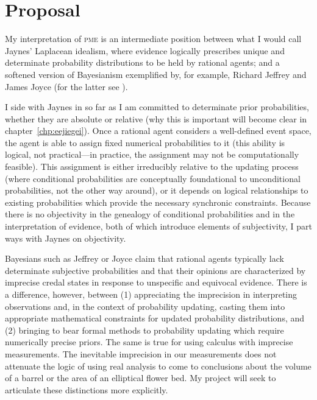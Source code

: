 \documentclass[phd,12pt,oneside]{ubcthesis}
\begin{document}
\section{Proposal}
\label{sec:maifeida}

My interpretation of \textsc{pme} is an intermediate position
between what I would call Jaynes' Laplacean idealism, where evidence
logically prescribes unique and determinate probability distributions
to be held by rational agents; and a softened version of Bayesianism
exemplified by, for example, Richard Jeffrey and James Joyce (for the
latter see ). 

I side with Jaynes in so far as I am committed to determinate prior
probabilities, whether they are absolute or relative (why this is
important will become clear in chapter~\ref{chp:eejiegei}). Once a
rational agent considers a well-defined event space, the agent is able
to assign fixed numerical probabilities to it (this ability is
logical, not practical---in practice, the assignment may not be
computationally feasible). This assignment is either irreducibly
relative to the updating process (where conditional probabilities are
conceptually foundational to unconditional probabilities, not the
other way around), or it depends on logical relationships to existing
probabilities which provide the necessary synchronic constraints.
Because there is no objectivity in the genealogy of conditional
probabilities and in the interpretation of evidence, both of which
introduce elements of subjectivity, I part ways with Jaynes on
objectivity.

 Bayesians such as Jeffrey or Joyce claim that
rational agents typically lack determinate subjective probabilities
and that their opinions are characterized by imprecise credal states
in response to unspecific and equivocal evidence. There is a
difference, however, between (1) appreciating the imprecision in
interpreting observations and, in the context of probability updating,
casting them into appropriate mathematical constraints for updated
probability distributions, and (2) bringing to bear formal methods to
probability updating which require numerically precise priors. The
same is true for using calculus with imprecise measurements. The
inevitable imprecision in our measurements does not attenuate the
logic of using real analysis to come to conclusions about the volume
of a barrel or the area of an elliptical flower bed. My project will
seek to articulate these distinctions more explicitly.
\end{document}
